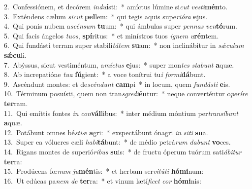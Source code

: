 {2.~}Confessiónem, et decórem \textit{in}\textit{du}\textbf{í}sti:~* amíctus lúmine si\textit{cut} \textit{ve}\textit{sti}\textbf{mén}to.\\
{3.~}Exténdens cælum \textit{si}\textit{cut} \textbf{pel}lem:~* qui tegis aquis supe\textit{ri}\textit{ó}\textit{ra} \textbf{e}jus.\\
{4.~}Qui ponis nubem a\textit{scén}\textit{sum} \textbf{tu}um:~* qui ámbulas super \textit{pen}\textit{nas} \textit{ven}\textbf{tó}rum.\\
{5.~}Qui facis ángelos \textit{tu}\textit{os}, \textbf{spí}ritus:~* et minístros tuos \textit{i}\textit{gnem} \textit{u}\textbf{rén}tem.\\
{6.~}Qui fundásti terram super stabili\textit{tá}\textit{tem} \textbf{su}am:~* non inclinábitur in \textit{sǽ}\textit{cu}\textit{lum} \textbf{sǽ}\textbf{cu}li.\\
{7.~}Abýssus, sicut vestiméntum, a\textit{mí}\textit{ctus} \textbf{e}jus:~* super mon\textit{tes} \textit{sta}\textit{bunt} \textbf{a}quæ.\\
{8.~}Ab increpatióne \textit{tu}\textit{a} \textbf{fú}gient:~* a voce tonítrui tu\textit{i} \textit{for}\textit{mi}\textbf{dá}bunt.\\
{9.~}Ascéndunt montes: et de\textit{scén}\textit{dunt} \textbf{cam}pi~* in locum, quem \textit{fun}\textit{dá}\textit{sti} \textbf{e}is.\\
{10.~}Términum posuísti, quem non tran\textit{sgre}\textit{di}\textbf{én}tur:~* neque converténtur o\textit{pe}\textit{rí}\textit{re} \textbf{ter}ram.\\
{11.~}Qui emíttis fontes \textit{in} \textit{con}\textbf{vál}libus:~* inter médium móntium per\textit{tran}\textit{sí}\textit{bunt} \textbf{a}quæ.\\
{12.~}Potábunt omnes bé\textit{sti}\textit{æ} \textbf{a}gri:~* exspectábunt ónagri \textit{in} \textit{si}\textit{ti} \textbf{su}a.\\
{13.~}Super ea vólucres cæli \textit{ha}\textit{bi}\textbf{tá}bunt:~* de médio petrá\textit{rum} \textit{da}\textit{bunt} \textbf{vo}ces.\\
{14.~}Rigans montes de superió\textit{ri}\textit{bus} \textbf{su}is:~* de fructu óperum tuórum sati\textit{á}\textit{bi}\textit{tur} \textbf{ter}ra:\\
{15.~}Prodúcens fœ\textit{num} \textit{ju}\textbf{mén}tis:~* et herbam ser\textit{vi}\textit{tú}\textit{ti} \textbf{hó}\textbf{mi}num:\\
{16.~}Ut edúcas pa\textit{nem} \textit{de} \textbf{ter}ra:~* et vinum lætí\textit{fi}\textit{cet} \textit{cor} \textbf{hó}\textbf{mi}nis:\\
